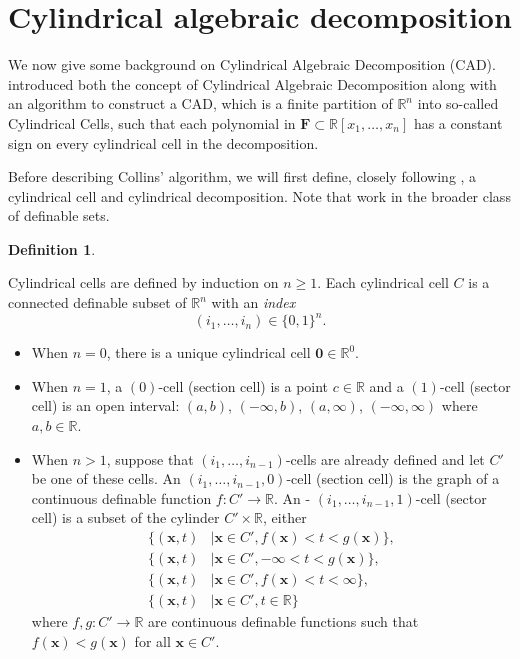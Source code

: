 \documentclass[
]{book}
\theoremstyle{definition}
\newtheorem{definition}{Definition}[chapter]
\theoremstyle{definition}
\theoremstyle{definition}
\theoremstyle{definition}
\theoremstyle{remark}
\begin{document}
\hypertarget{cylindrical-algebraic-decomposition}{%
\section{Cylindrical algebraic decomposition}\label{cylindrical-algebraic-decomposition}}

We now give some background on Cylindrical Algebraic Decomposition (CAD).
\citet{collins1975} introduced both the concept of Cylindrical Algebraic Decomposition along with an algorithm to construct a CAD, which is a finite partition of \(\mathbb{R}^n\) into so-called Cylindrical Cells, such that each polynomial in \(\mathbf{F} \subset \mathbb{R}[x_1,\ldots,x_n]\) has a constant sign on every cylindrical cell in the decomposition.

Before describing Collins' algorithm, we will first define, closely following \citet{bgv15}, a cylindrical cell and cylindrical decomposition. Note that \citet{bgv15} work in the broader class of definable sets.

\begin{definition}
\protect\hypertarget{def:cells}{}\label{def:cells}

Cylindrical cells are defined by induction on \(n\ge 1\). Each cylindrical cell \(C\) is a connected definable subset of \(\mathbb{R}^n\) with an \emph{index}
\[
(i_1,\ldots,i_n) \in \{0,1\}^n.
\]

\begin{itemize}
\item
  When \(n = 0\), there is a unique cylindrical cell \(\mathbf{0} \in \mathbb{R}^0\).
\item
  When \(n = 1\), a \((0)\)-cell (section cell) is a point \(c \in \mathbb{R}\) and a \((1)\)-cell (sector cell) is an open interval: \((a,b)\), \((-\infty,b)\), \((a,\infty)\), \((-\infty,\infty)\) where \(a,b\in \mathbb{R}\).
\item
  When \(n > 1\), suppose that \((i_1,\ldots,i_{n-1})\)-cells are already defined and let \(C'\) be one of these cells.
  An \((i_1,\ldots,i_{n-1},0)\)-cell (section cell) is the graph of a continuous definable function \(f : C' \to \mathbb{R}\).
  An - \((i_1,\ldots,i_{n-1},1)\)-cell (sector cell) is a subset of the cylinder \(C' \times \mathbb{R}\), either
  \[
  \begin{aligned}
  \{ (\mathbf{x},t) &\mid \mathbf{x} \in C', f(\mathbf{x}) < t < g(\mathbf{x})\},\\
  \{ (\mathbf{x},t) &\mid \mathbf{x} \in C', -\infty < t < g(\mathbf{x})\},\\
  \{ (\mathbf{x},t) &\mid \mathbf{x} \in C', f(\mathbf{x}) < t < \infty\},\\
  \{ (\mathbf{x},t) &\mid \mathbf{x} \in C', t \in \mathbb{R}\}
  \end{aligned}
  \]
  where \(f,g : C' \to \mathbb{R}\) are continuous definable functions such that \(f(\mathbf{x}) < g(\mathbf{x})\) for all \(\mathbf{x} \in C'\).
\end{itemize}

\end{definition}
\end{document}
